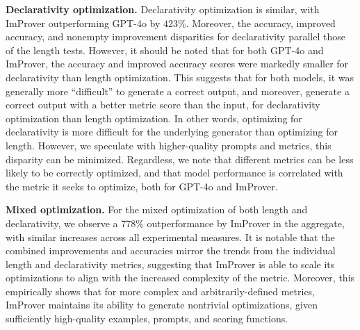 \textbf{Declarativity optimization.} Declarativity optimization is similar, with ImProver outperforming GPT-4o by $423\%$. Moreover, the accuracy, improved accuracy, and nonempty improvement disparities for declarativity parallel those of the length tests. However, it should be noted that for both GPT-4o and ImProver, the accuracy and improved accuracy scores were markedly smaller for declarativity than length optimization. This suggests that for both models, it was generally more ``difficult'' to generate a correct output, and moreover, generate a correct output with a better metric score than the input, for declarativity optimization than length optimization. In other words, optimizing for declarativity is more difficult for the underlying generator than optimizing for length. However, we speculate with higher-quality prompts and metrics, this disparity can be minimized. Regardless, we note that different metrics can be less likely to be correctly optimized, and that model performance is correlated with the metric it seeks to optimize, both for GPT-4o and ImProver.

\textbf{Mixed optimization.} For the mixed optimization of both length and declarativity, we observe a $778\%$ outperformance by ImProver in the aggregate, with similar increases across all experimental measures. It is notable that the combined improvements and accuracies mirror the trends from the individual length and declarativity metrics, suggesting that ImProver is able to scale its optimizations to align with the increased complexity of the metric. Moreover, this empirically shows that for more complex and arbitrarily-defined metrics, ImProver maintains its ability to generate nontrivial optimizations, given sufficiently high-quality examples, prompts, and scoring functions.

